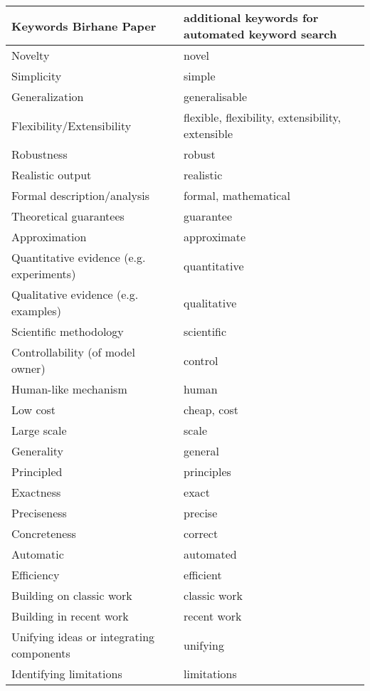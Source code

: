 \documentclass{article}
\begin{document}
\begin{table}[h]
    \centering
    \begin{tabular}{|l|l|}
        \hline
        \textbf{Keywords Birhane Paper} & \textbf{additional keywords for automated keyword search} \\
        \hline
        Novelty & novel \\
        Simplicity & simple \\
        Generalization & generalisable \\
        Flexibility/Extensibility & flexible, flexibility, extensibility, extensible \\
        Robustness & robust \\
        Realistic output & realistic \\
        Formal description/analysis & formal, mathematical \\
        Theoretical guarantees & guarantee \\
        Approximation & approximate \\
        Quantitative evidence (e.g. experiments) & quantitative \\
        Qualitative evidence (e.g. examples) & qualitative \\
        Scientific methodology & scientific \\
        Controllability (of model owner) & control \\
        Human-like mechanism & human \\
        Low cost & cheap, cost \\
        Large scale & scale \\
        Generality & general \\
        Principled & principles \\
        Exactness & exact \\
        Preciseness & precise \\
        Concreteness & correct \\
        Automatic & automated \\
        Efficiency & efficient \\
        Building on classic work & classic work \\
        Building in recent work & recent work \\
        Unifying ideas or integrating components & unifying \\
        Identifying limitations & limitations \\

\end{tabular}
\end{table}
\end{document}
